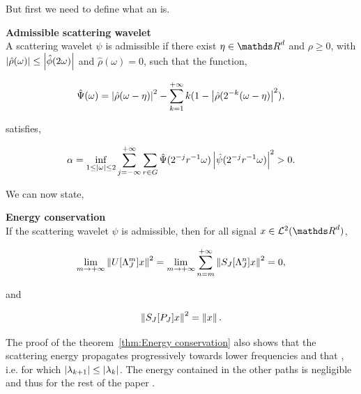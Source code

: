 \documentclass[a4paper,11pt]{report}
\begin{document}
{			But first we need to define what an  is.
			
			\begin{prop} \textbf{Admissible scattering wavelet}\\ 
				A scattering wavelet $\psi$ is admissible if there exist $\eta \in \dsR^{d}$ and $\rho \geq 0$, with $\left| \hat{\rho}(\omega) \right| \leq \left| \hat{\phi}(2\omega) \right|$ and $\hat{\rho}(\omega)=0$, such that the function,
				
				\begin{equation}
					\hat{\Psi}(\omega) = \left| \hat{\rho}(\omega - \eta) \right|^{2} - \sum_{k=1}^{+\infty}k(1-\left| \hat{\rho}(2^{-k}(\omega - \eta) \right|^{2}),
				\end{equation}
				
				satisfies,
				
				\begin{equation}
				  \alpha = \inf_{1 \leq \left| \omega \right|\leq 2} \sum_{j=-\infty}^{+\infty}\sum_{r \in G} \hat{\Psi}(2^{-j}r^{-1}\omega) \left| \hat{\psi}(2^{-j}r^{-1}\omega) \right|^{2} > 0.
				\end{equation}
				
				\label{pty:Admissible wavelet}
			\end{prop}

			We can now state,
			
			\begin{thm} \textbf{Energy conservation}\\ 
				If the scattering wavelet $\psi$ is admissible, then for all signal $x \in \mathcal{L}^{2}(\dsR^{d})$, %
				
				\begin{equation}
				  \lim_{m \rightarrow +\infty} \left\lVert U[\Lambda_{J}^{m}]x \right\rVert^{2} = \lim_{m \rightarrow +\infty} \sum_{n=m}^{+\infty} \left\lVert S_{J}[\Lambda_{J}^{n}]x \right\rVert^{2} = 0,
					\label{eq:energy conservation 1}
				\end{equation}
				
				and
				
				\begin{equation}
				  \left\lVert S_{J}[P_{J}]x \right\rVert^{2} = \left\lVert x \right\rVert.
				  \label{eq:energy conservation 2}
				\end{equation}
				\label{thm:Energy conservation}
			\end{thm}

			The proof of the theorem~\ref{thm:Energy conservation} also shows that the scattering energy propagates progressively towards lower frequencies and that , i.e. for which $\left| \lambda_{k+1} \right| \leq \left| \lambda_{k} \right|$. The energy contained in the other paths is negligible and thus for the rest of the paper .\\
			
}
\end{document}
